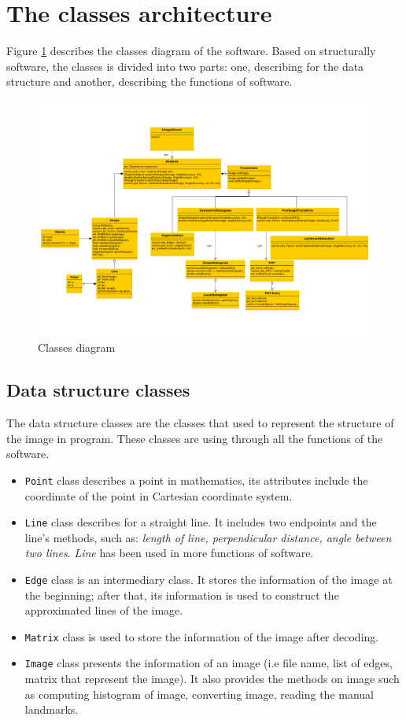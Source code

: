 \section{The classes architecture}
Figure \ref{figclassdiagram} describes the classes diagram of the software. Based on structurally software, the classes is divided into two parts: one, describing for the data structure and another, describing the functions of software.
\begin{figure}[!h]
	\centering
	\includegraphics[scale=0.8, angle = -90]{images/classDiagram}
	\caption{Classes diagram}
	\label{figclassdiagram}
\end{figure}
\subsection{Data structure classes}
The data structure classes are the classes that used to represent the structure of the image in program. These classes are using through all the functions of the software.
\begin{itemize}
	\item \texttt{Point} class describes a point in mathematics, its attributes include the coordinate of the point in Cartesian coordinate system.
	\item \texttt{Line} class describes for a straight line. It includes two endpoints and the line's methods, such as: \textit{length of line, perpendicular distance, angle between two lines}. \textit{Line} has been used in more functions of software.
	\item \texttt{Edge} class is an intermediary class. It stores the information of the image at the beginning; after that, its information is used to construct the approximated lines of the image.
	\item \texttt{Matrix} class is used to store the information of the image after decoding.
	\item \texttt{Image} class presents the information of an image (i.e file name, list of edges, matrix that represent the image). It also provides the methods on image such as computing histogram of image, converting image, reading the manual landmarks.
\end{itemize} 
